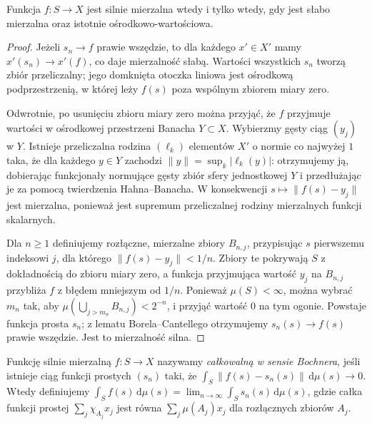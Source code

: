 \begin{twierdzenie}
\label{thm:pettis-meas15b}
Funkcja $f:S\to X$ jest silnie mierzalna wtedy i tylko wtedy, gdy
jest słabo mierzalna oraz istotnie ośrodkowo-wartościowa.
\end{twierdzenie}
\begin{proof}
Jeżeli $s_n\to f$ prawie wszędzie, to dla każdego $x'\in X'$
mamy $x'(s_n)\to x'(f)$, co daje mierzalność słabą.
Wartości wszystkich $s_n$ tworzą zbiór przeliczalny;
jego domknięta otoczka liniowa jest ośrodkową podprzestrzenią,
w której leży $f(s)$ poza wspólnym zbiorem miary zero.

Odwrotnie, po usunięciu zbioru miary zero można przyjąć, że $f$
przyjmuje wartości w ośrodkowej przestrzeni Banacha $Y\subset X$.
Wybierzmy gęsty ciąg $(y_j)$ w $Y$. Istnieje przeliczalna
rodzina $(\ell_k)$ elementów $X'$ o normie co najwyżej $1$
taka, że dla każdego $y\in Y$ zachodzi
$\|y\|=\sup_k|\ell_k(y)|$: otrzymujemy ją, dobierając
funkcjonały normujące gęsty zbiór sfery jednostkowej $Y$
i przedłużając je za pomocą twierdzenia Hahna--Banacha.
W konsekwencji $s\mapsto\|f(s)-y_j\|$ jest mierzalna,
ponieważ jest supremum przeliczalnej rodziny mierzalnych
funkcji skalarnych.

Dla $n\ge1$ definiujemy rozłączne, mierzalne zbiory $B_{n,j}$,
przypisując $s$ pierwszemu indeksowi $j$, dla którego
$\|f(s)-y_j\|<1/n$. Zbiory te pokrywają $S$ z dokładnością
do zbioru miary zero, a funkcja przyjmująca wartość $y_j$
na $B_{n,j}$ przybliża $f$ z błędem mniejszym od $1/n$.
Ponieważ $\mu(S)<\infty$, można wybrać $m_n$ tak, aby
$\mu(\bigcup_{j>m_n}B_{n,j})<2^{-n}$, i przyjąć wartość
$0$ na tym ogonie. Powstaje funkcja prosta $s_n$;
z lematu Borela--Cantellego otrzymujemy $s_n(s)\to f(s)$
prawie wszędzie. Jest to mierzalność silna.
\end{proof}

\begin{definicja}
\label{def:bochner15b}
Funkcję silnie mierzalną $f:S\to X$ nazywamy
\emph{całkowalną w sensie Bochnera}, jeśli istnieje ciąg
funkcji prostych $(s_n)$ taki, że
$\int_S\|f(s)-s_n(s)\|\,\mathrm d\mu(s)\to0$.
Wtedy definiujemy
$\int_S f(s)\,\mathrm d\mu(s)
=\lim_{n\to\infty}\int_S s_n(s)\,\mathrm d\mu(s)$,
gdzie całka funkcji prostej $\sum_j\chi_{A_j}x_j$ jest
równa $\sum_j\mu(A_j)x_j$ dla rozłącznych zbiorów $A_j$.
\end{definicja}

